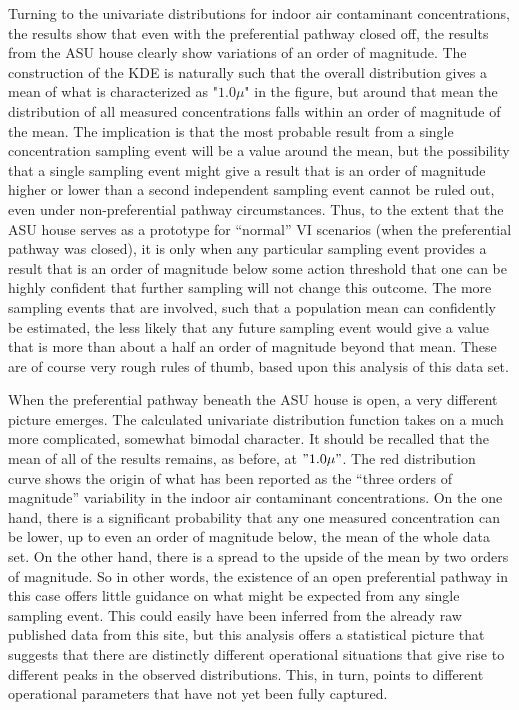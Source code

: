 \documentclass[journal=esthag,manuscript=article]{achemso}
\begin{document}
Turning to the univariate distributions for indoor air contaminant concentrations, the results show that even with the preferential pathway closed off, the results from the ASU house clearly show variations of an order of magnitude.
The construction of the KDE is naturally such that the overall distribution gives a mean of what is characterized as "$1.0 \mu$" in the figure, but around that mean the distribution of all measured concentrations falls within an order of magnitude of the mean.
The implication is that the most probable result from a single concentration sampling event will be a value around the mean, but the possibility that a single sampling event might give a result that is an order of magnitude higher or lower than a second independent sampling event cannot be ruled out, even under non-preferential pathway circumstances.
Thus, to the extent that the ASU house serves as a prototype for “normal” VI scenarios (when the preferential pathway was closed), it is only when any particular sampling event provides a result that is an order of magnitude below some action threshold that one can be highly confident that further sampling will not change this outcome.
The more sampling events that are involved, such that a population mean can confidently be estimated, the less likely that any future sampling event would give a value that is more than about a half an order of magnitude beyond that mean.
These are of course very rough rules of thumb, based upon this analysis of this data set.

When the preferential pathway beneath the ASU house is open, a very different picture emerges.
The calculated univariate distribution function takes on a much more complicated, somewhat bimodal character.
It should be recalled that the mean of all of the results remains, as before, at $"1.0 \mu"$.
The red distribution curve shows the origin of what has been reported as the “three orders of magnitude” variability in the indoor air contaminant concentrations.
On the one hand, there is a significant probability that any one measured concentration can be lower, up to even an order of magnitude below, the mean of the whole data set.
On the other hand, there is a spread to the upside of the mean by two orders of magnitude.
So in other words, the existence of an open preferential pathway in this case offers little guidance on what might be expected from any single sampling event.
This could easily have been inferred from the already raw published data from this site, but this analysis offers a statistical picture that suggests that there are distinctly different operational situations that give rise to different peaks in the observed distributions.
This, in turn, points to different operational parameters that have not yet been fully captured.
\end{document}
